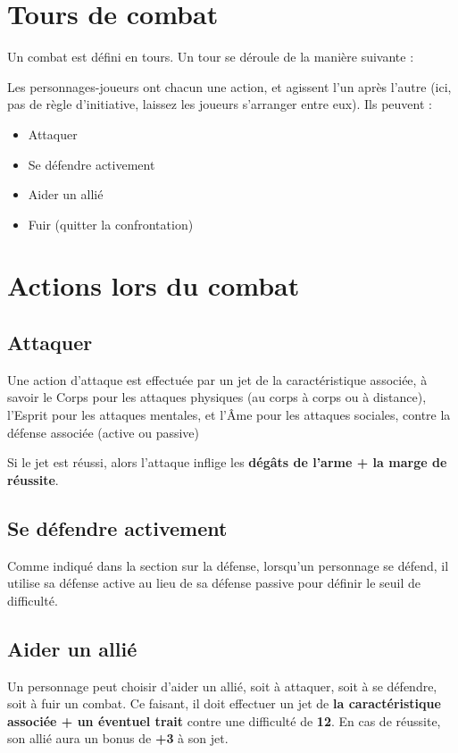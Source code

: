 \documentclass[a4paper,10pt,twoside,twocolumn,openany,bg=print]{dndbook}
\begin{document}
\section{Tours de combat}

Un combat est défini en tours. Un tour se déroule de la manière suivante :

Les personnages-joueurs ont chacun une action, et agissent l'un après l'autre (ici, pas de règle d'initiative, laissez les joueurs s'arranger entre eux). Ils peuvent :

\begin{itemize}
\item Attaquer
\item Se défendre activement
\item Aider un allié
\item Fuir (quitter la confrontation)
\end{itemize}

\section{Actions lors du combat}

\subsection*{Attaquer}

Une action d'attaque est effectuée par un jet de la caractéristique associée, à savoir le Corps pour les attaques physiques (au corps à corps ou à distance), l'Esprit pour les attaques mentales, et l'Âme pour les attaques sociales, contre la défense associée (active ou passive)

Si le jet est réussi, alors l'attaque inflige les \textbf{dégâts de l'arme + la marge de réussite}.

\subsection*{Se défendre activement}

Comme indiqué dans la section sur la défense, lorsqu'un personnage se défend, il utilise sa défense active au lieu de sa défense passive pour définir le seuil de difficulté.

\subsection*{Aider un allié}

Un personnage peut choisir d'aider un allié, soit à attaquer, soit à se défendre, soit à fuir un combat. Ce faisant, il doit effectuer un jet de \textbf{la caractéristique associée + un éventuel trait} contre une difficulté de \textbf{12}. En cas de réussite, son allié aura un bonus de \textbf{+3} à son jet.
\end{document}
